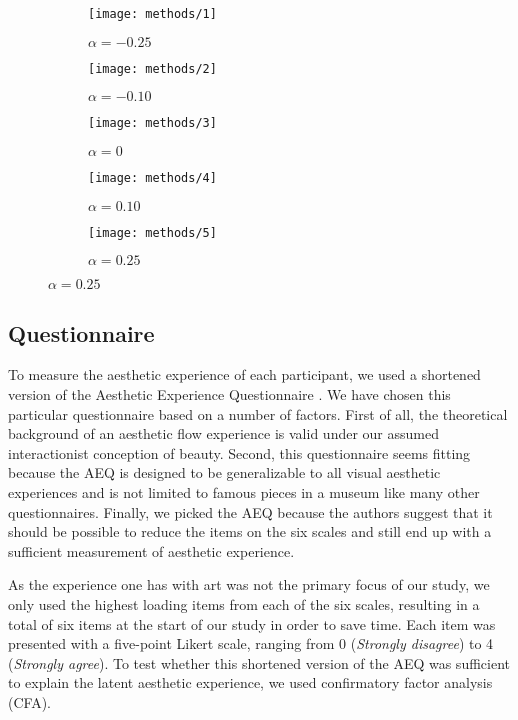 \documentclass[../main.tex]{subfiles}
\begin{document}
\begin{figure}[ht]
	\caption{Truncated Sample of an Image Sequence Produced by GANalyze}
	\label{fig:sample_sequence}
	\centering
	\begin{subfigure}{.18\textwidth}
		\centering
		\texttt{[image: methods/1]}
		\caption{\centering $\alpha = -0.25$}
	\end{subfigure} \hfill
	\begin{subfigure}{.18\textwidth}
		\centering
		\texttt{[image: methods/2]}
		\caption{\centering $\alpha = -0.10$}
	\end{subfigure} \hfill
	\begin{subfigure}{.18\textwidth}
		\centering
		\texttt{[image: methods/3]}
		\caption{\centering $\alpha = 0$}
	\end{subfigure} \hfill
	\begin{subfigure}{.18\textwidth}
		\centering
		\texttt{[image: methods/4]}
		\caption{\centering $\alpha = 0.10$}
	\end{subfigure} \hfill
	\begin{subfigure}{.18\textwidth}
		\centering
		\texttt{[image: methods/5]}
		\caption{\centering $\alpha = 0.25$}
	\end{subfigure} \hfill
\end{figure}
	
\subsection{Questionnaire}
To measure the aesthetic experience of each participant, we used a shortened version of the Aesthetic Experience Questionnaire \parencite[AEQ;][]{wanzerExperiencingFlowViewing2020}. We have chosen this particular questionnaire based on a number of factors. First of all, the theoretical background of an aesthetic flow experience \parencite{csikszentmihalyi1990art} is valid under our assumed interactionist conception of beauty. Second, this questionnaire seems fitting because the AEQ is designed to be generalizable to all visual aesthetic experiences and is not limited to famous pieces in a museum like many other questionnaires. Finally, we picked the AEQ because the authors suggest that it should be possible to reduce the items on the six scales and still end up with a sufficient measurement of aesthetic experience.

As the experience one has with art was not the primary focus of our study, we only used the highest loading items from each of the six scales, resulting in a total of six items at the start of our study in order to save time. Each item was presented with a five-point Likert scale, ranging from 0 (\textit{Strongly disagree}) to 4 (\textit{Strongly agree}). To test whether this shortened version of the AEQ was sufficient to explain the latent aesthetic experience, we used confirmatory factor analysis (CFA).
	
\end{document}
